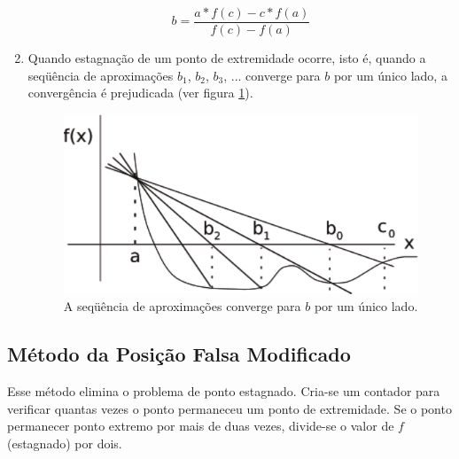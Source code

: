 \begin{enumerate}
\[ \displaystyle b = \frac{a \ast f(c) - c \ast f(a)}{f(c) - f(a)} \]

\item Quando estagnação de um ponto de extremidade ocorre, isto é, quando a seqüência de aproximações $b_{1}$, $b_{2}$, $b_{3}$, ... converge para $b$ por um único lado, a convergência é prejudicada (ver figura \ref{fig:posicaofalsa2}).

\begin{figure}[htb]
  \setlength{\abovecaptionskip}{20pt}
  \centering
  \includegraphics[scale=0.8]{capitulos/capitulo1/figuras/posicaofalsa2-eps-converted-to.pdf}
  \caption{A seqüência de aproximações converge para $b$ por um único lado.}
  \label{fig:posicaofalsa2}
\end{figure}

\end{enumerate}

\subsection{Método da Posição Falsa Modificado}

Esse método elimina o problema de ponto estagnado. Cria-se um contador para verificar quantas vezes o ponto permaneceu um ponto de extremidade. Se o ponto permanecer ponto extremo por mais de duas vezes, divide-se o valor de $f$ (estagnado) por dois.

